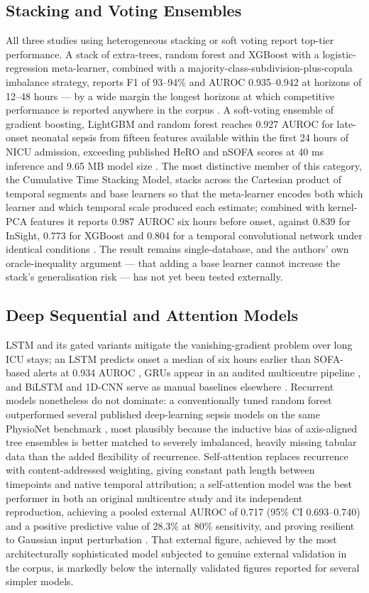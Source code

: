 \documentclass[conference]{IEEEtran}
\begin{document}
\subsection{Stacking and Voting Ensembles}

All three studies using heterogeneous stacking or soft voting report top-tier performance. A stack of extra-trees, random forest and XGBoost with a logistic-regression meta-learner, combined with a majority-class-subdivision-plus-copula imbalance strategy, reports F1 of 93--94\% and AUROC 0.935--0.942 at horizons of 12--48 hours --- by a wide margin the longest horizons at which competitive performance is reported anywhere in the corpus \cite{r14}. A soft-voting ensemble of gradient boosting, LightGBM and random forest reaches 0.927 AUROC for late-onset neonatal sepsis from fifteen features available within the first 24 hours of NICU admission, exceeding published HeRO and nSOFA scores at 40 ms inference and 9.65 MB model size \cite{r32}. The most distinctive member of this category, the Cumulative Time Stacking Model, stacks across the Cartesian product of temporal segments and base learners so that the meta-learner encodes both which learner and which temporal scale produced each estimate; combined with kernel-PCA features it reports 0.987 AUROC six hours before onset, against 0.839 for InSight, 0.773 for XGBoost and 0.804 for a temporal convolutional network under identical conditions \cite{r33}. The result remains single-database, and the authors' own oracle-inequality argument --- that adding a base learner cannot increase the stack's generalisation risk --- has not yet been tested externally.

\subsection{Deep Sequential and Attention Models}

LSTM and its gated variants mitigate the vanishing-gradient problem over long ICU stays; an LSTM predicts onset a median of six hours earlier than SOFA-based alerts at 0.934 AUROC \cite{r13}, GRUs appear in an audited multicentre pipeline \cite{r18}, and BiLSTM and 1D-CNN serve as manual baselines elsewhere \cite{r19,r31}. Recurrent models nonetheless do not dominate: a conventionally tuned random forest outperformed several published deep-learning sepsis models on the same PhysioNet benchmark \cite{r30}, most plausibly because the inductive bias of axis-aligned tree ensembles is better matched to severely imbalanced, heavily missing tabular data than the added flexibility of recurrence. Self-attention replaces recurrence with content-addressed weighting, giving constant path length between timepoints and native temporal attribution; a self-attention model was the best performer in both an original multicentre study and its independent reproduction, achieving a pooled external AUROC of 0.717 (95\% CI 0.693--0.740) and a positive predictive value of 28.3\% at 80\% sensitivity, and proving resilient to Gaussian input perturbation \cite{r18}. That external figure, achieved by the most architecturally sophisticated model subjected to genuine external validation in the corpus, is markedly below the internally validated figures reported for several simpler models.
\end{document}
